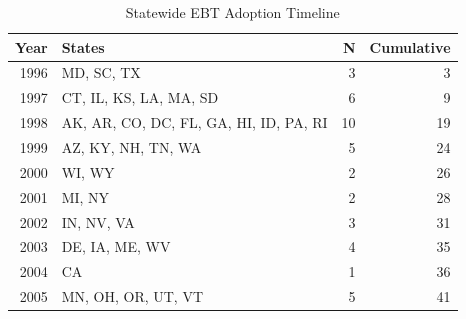 \begin{table}[!h]
\centering
\caption{\label{tab:ebt_timeline}Statewide EBT Adoption Timeline}
\centering
\begin{tabular}[t]{rlrr}
\toprule
Year & States & N & Cumulative\\
\midrule
1996 & MD, SC, TX & 3 & 3\\
1997 & CT, IL, KS, LA, MA, SD & 6 & 9\\
1998 & AK, AR, CO, DC, FL, GA, HI, ID, PA, RI & 10 & 19\\
1999 & AZ, KY, NH, TN, WA & 5 & 24\\
2000 & WI, WY & 2 & 26\\
2001 & MI, NY & 2 & 28\\
2002 & IN, NV, VA & 3 & 31\\
2003 & DE, IA, ME, WV & 4 & 35\\
2004 & CA & 1 & 36\\
2005 & MN, OH, OR, UT, VT & 5 & 41\\
\bottomrule
\end{tabular}
\end{table}
